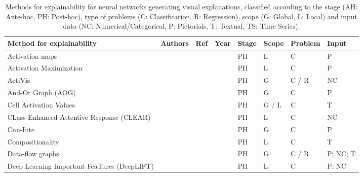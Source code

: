 \documentclass[final,1p,times]{elsarticle}
\begin{document}
\begin{table}[htbp]
\footnotesize
    \caption{Methods for explainability for neural networks generating visual explanations, classified according to the stage (AH: Ante-hoc, PH: Post-hoc), type of problems (C: Classification, R: Regression), scope (G: Global, L: Local) and input data (NC: Numerical/Categorical, P: Pictorials, T: Textual, TS: Time Series).}
    \label{tab:neural-networks-visual}
    \begin{tabular}{m{3.9cm} m{2.7cm} m{0.5cm} m{0.5cm} m{0.5cm} m{0.6cm} m{0.8cm} m{1.05cm}}
    \hline
    Method for explainability & Authors & Ref & Year & Stage & Scope & Problem & Input\\
    \hline
    Activation maps &  \citeauthor{hamidi2019interactive} &  \cite{hamidi2019interactive} &  \citeyear{hamidi2019interactive} & PH & L & C & P\\
    Activation Maximization &  \citeauthor{erhan2010understanding,nguyen2016multifaceted} &  \cite{erhan2010understanding,nguyen2016multifaceted,nguyen2016synthesizing} &  \citeyear{erhan2010understanding,nguyen2016multifaceted} & PH & L & C & P\\
    ActiVis &  \citeauthor{kahng2018cti} &  \cite{kahng2018cti} &  \citeyear{kahng2018cti} & PH & G & C / R & NC\\
    And-Or Graph (AOG) &  \citeauthor{zhang2017growing} &  \cite{zhang2017growing} &  \citeyear{zhang2017growing} & PH & G & C & P\\
    Cell Activation Values & \citeauthor{karpathy2015visualizing} & \cite{karpathy2015visualizing} &  \citeyear{karpathy2015visualizing} & PH & G / L & C & T\\
    CLass-Enhanced Attentive Response (CLEAR) & \citeauthor{kumar2017explaining} & \cite{kumar2017explaining} &  \citeyear{kumar2017explaining} & PH & L & C & NC\\
    Cnn-Inte & \citeauthor{liu2018interpretable} & \cite{liu2018interpretable} & \citeyear{liu2018interpretable} & PH & G & C & P\\
    Compositionality & \citeauthor{li2016visualizing} & \cite{li2016visualizing} & \citeyear{li2016visualizing} & PH & L & C & T\\
    Data-flow graphs & \citeauthor{wongsuphasawat2018visualizing} & \cite{wongsuphasawat2018visualizing} &  \citeyear{wongsuphasawat2018visualizing} & PH & G & C / R & P; NC; T\\
    Deep Learning Important FeaTures (DeepLIFT) & \citeauthor{shrikumar2017learning} & \cite{shrikumar2017learning} &  \citeyear{shrikumar2017learning} & PH & L & C & P; NC\\

\end{tabular}
\end{table}
\end{document}
